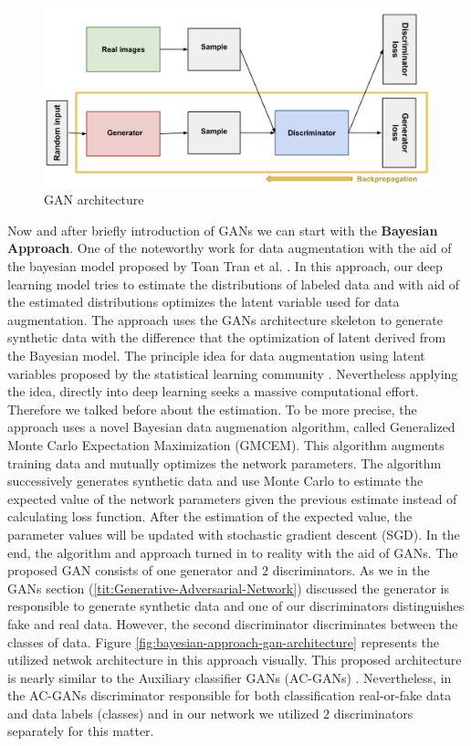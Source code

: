 \begin{figure}
  \centering
  \label{fig:gan_architecture}
  \includegraphics[width=1\textwidth]{fig/gan_architectur}
  \caption{GAN architecture
    \cite{TODO-google-reference}}
\end{figure}

Now and after briefly introduction of GANs we can start with the \textbf{Bayesian Approach}. One of
the noteworthy work for data augmentation with the aid of the bayesian model proposed by Toan Tran
et al. \cite{bayesian_approach}. In this approach, our deep learning model tries to estimate the
distributions of labeled data and with aid of the estimated distributions optimizes the latent
variable used for data augmentation. The approach uses the GANs architecture skeleton to generate
synthetic data with the difference that the optimization of latent derived from the Bayesian model.
The principle idea for data augmentation using latent variables proposed by the statistical learning
community \cite{Statistical_data_augmentation}. Nevertheless applying the idea, directly into deep
learning seeks a massive computational effort. Therefore we talked before about the estimation. To
be more precise, the
approach uses a novel Bayesian data augmenation algorithm, called Generalized Monte Carlo Expectation Maximization
(GMCEM). This algorithm augments training data and mutually optimizes the network parameters. The
algorithm successively generates synthetic data and use Monte Carlo to estimate the expected value
of the network parameters given the previous estimate instead of calculating loss function. After
the estimation of the expected value, the parameter values will be updated with stochastic gradient
descent (SGD). In the end, the algorithm and approach turned in to reality with the aid of GANs. The
proposed GAN consists of one generator and $2$ discriminators. As we in the GANs section
(\ref{tit:Generative-Adversarial-Network}) discussed the generator is responsible to generate
synthetic data and one of our discriminators distinguishes fake and real data. However, the second
discriminator discriminates between the classes of data. Figure
\ref{fig:bayesian-approach-gan-architecture} represents the utilized netwok architecture in this
approach visually. This proposed architecture is nearly similar to the Auxiliary classifier GANs
(AC-GANs) \cite{AC-GANS}. Nevertheless, in the AC-GANs discriminator responsible for both
classification real-or-fake data and data labels (classes) and in our network we utilized $2$
discriminators separately for this matter.

